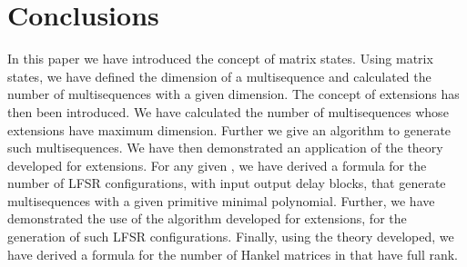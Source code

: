 \documentclass[letterpaper, 12 pt]{article}  \usepackage{amssymb}
\begin{document}
\section{Conclusions}
In this paper we have introduced the concept of matrix states. Using matrix
states, we have defined the dimension of a multisequence and calculated the
number of multisequences with a given dimension. The concept of extensions
has then been introduced. We have calculated the number of multisequences
whose
extensions have maximum dimension. Further we give an algorithm to
generate such multisequences.  We have then demonstrated an application of the
theory developed for extensions. For any given , we have derived a
formula for the number of LFSR configurations, with  input  output
delay blocks, that generate multisequences with a given primitive minimal
polynomial. Further, we have demonstrated the use of the algorithm developed for
extensions, for the generation of such LFSR configurations. Finally, using
the theory developed, we have derived a formula for the number of Hankel
matrices in  that have full rank.
       
 \nopagebreak


\end{document}
